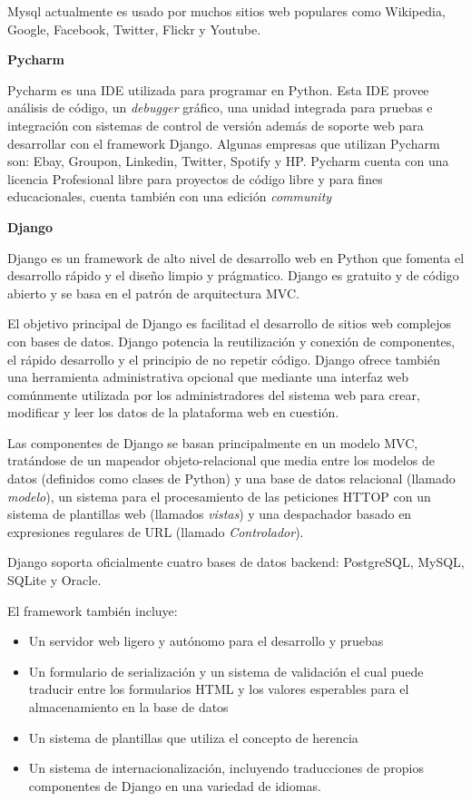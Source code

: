 		Mysql actualmente es usado por muchos sitios web populares como Wikipedia, Google, Facebook, Twitter, Flickr y Youtube. 
		
	\item \textbf{Pycharm}
	
		Pycharm \cite{pycharmWeb} es una IDE utilizada para programar en Python. Esta IDE provee análisis de código, un \emph{debugger} gráfico, una unidad integrada para pruebas e integración con sistemas de control de versión además de soporte web para desarrollar con el framework Django. Algunas empresas que utilizan Pycharm son: Ebay, Groupon, Linkedin, Twitter, Spotify y HP. Pycharm cuenta con una licencia Profesional libre para proyectos de código libre y para fines educacionales, cuenta también con una edición \emph{community}

	\item \textbf{Django}
	
	Django \cite{djangoWeb} es un framework de alto nivel de desarrollo web en Python que fomenta el desarrollo rápido y el diseño limpio y prágmatico. Django es gratuito y de código abierto y se basa en el patrón de arquitectura MVC.
	
	El objetivo principal de Django es facilitad el desarrollo de sitios web complejos con bases de datos. Django potencia la reutilización y conexión de componentes, el rápido desarrollo y el principio de no repetir código. Django ofrece también una herramienta administrativa opcional que mediante una interfaz web comúnmente utilizada por los administradores del sistema web para crear, modificar y leer los datos de la plataforma web en cuestión. 
	
	Las componentes de Django se basan principalmente en un modelo MVC, tratándose de un mapeador objeto-relacional que media entre los modelos de datos (definidos como clases de Python) y una base de datos relacional (llamado \emph{modelo}), un sistema para el procesamiento de las peticiones HTTOP con un sistema de plantillas web (llamados \emph{vistas}) y una despachador basado en expresiones regulares de URL (llamado \emph{Controlador}).
	
	Django soporta oficialmente cuatro bases de datos backend: PostgreSQL, MySQL, SQLite y Oracle.
	
	El framework también incluye:
	
	\begin{itemize}
		\item Un servidor web ligero y autónomo para el desarrollo y pruebas
		\item Un formulario de serialización y un sistema de validación el cual puede traducir entre los formularios HTML y los valores esperables para el almacenamiento en la base de datos
		\item Un sistema de plantillas que utiliza el concepto de herencia
		\item Un sistema de internacionalización, incluyendo traducciones de propios componentes de Django en una variedad de idiomas.
	\end{itemize}
	
